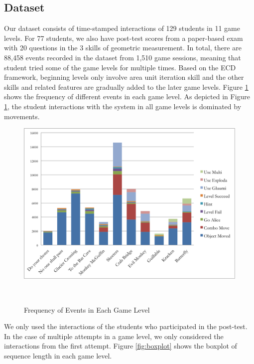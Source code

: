 \documentclass{sigchi}
\begin{document}
\subsection{Dataset} 
Our dataset consists of time-stamped interactions of 129 students in 11 game levels. 
For 77 students, we also have post-test scores from a paper-based exam with 20 questions in the 3 skills of geometric measurement.
In total, there are 88,458 events recorded in the dataset from 1,510 game sessions, meaning that student tried some of the game levels for multiple times.
Based on the ECD framework, beginning levels only involve area unit iteration skill and the other skills and related features are gradually added to the later game levels.
Figure \ref{fig:frequency} shows the frequency of different events in each game level. As depicted in Figure \ref{fig:frequency}, the student interactions with the system in all game levels is dominated by movements.

\begin{figure}
	\centering
	\includegraphics[width=0.9\columnwidth]{figures/frequency.png}
	\caption{Frequency of Events in Each Game Level}~\label{fig:frequency}
\end{figure}

We only used the interactions of the students who participated in the post-test.
In the case of multiple attempts in a game level, we only considered the interactions from the first attempt.
Figure \ref{fig:boxplot} shows the boxplot of sequence length in each game level. 
\end{document}
